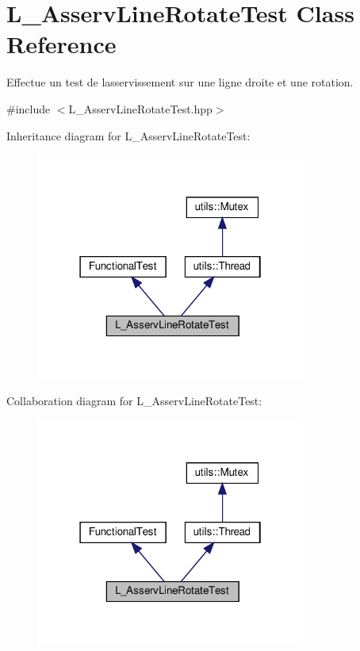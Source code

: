 \hypertarget{classL__AsservLineRotateTest}{}\section{L\+\_\+\+Asserv\+Line\+Rotate\+Test Class Reference}
\label{classL__AsservLineRotateTest}


Effectue un test de l\textquotesingle{}asservissement sur une ligne droite et une rotation.  




{\ttfamily \#include $<$L\+\_\+\+Asserv\+Line\+Rotate\+Test.\+hpp$>$}



Inheritance diagram for L\+\_\+\+Asserv\+Line\+Rotate\+Test\+:
\nopagebreak
\begin{figure}[H]
\begin{center}
\leavevmode
\includegraphics[width=250pt]{classL__AsservLineRotateTest__inherit__graph}
\end{center}
\end{figure}


Collaboration diagram for L\+\_\+\+Asserv\+Line\+Rotate\+Test\+:
\nopagebreak
\begin{figure}[H]
\begin{center}
\leavevmode
\includegraphics[width=250pt]{classL__AsservLineRotateTest__coll__graph}
\end{center}
\end{figure}
